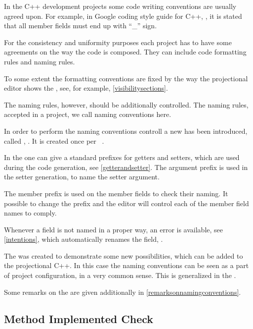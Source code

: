 In the C++ development projects some code writing conventions are usually agreed upon. For example, 
in Google coding style guide for C++, \cite{googlecppstyle}, it is stated that all member fields must end up with ``\_'' sign.

For the consistency and uniformity purposes each project has to have some agreements on the way the code is composed.
They can include code formatting rules and naming rules. 

To some extent the formatting conventions are fixed by the way the projectional editor shows the 
, see, for example, \ref{visibilitysections}.

The naming rules, however, should be additionally controlled. The naming rules, accepted in a project, we call 
naming conventions here.

In order to perform the naming conventions controll a new  has been introduced, called , 
. It is created once per \jbmps\ .


In the  one can give a standard prefixes for getters and setters, which are used during the code 
generation, see \ref{getterandsetter}. The argument prefix is used in the setter generation, to name the
setter argument.

The member prefix is used on the member fields to check their naming. It possible to change the prefix and the editor will control
each of the member field names to comply.

Whenever a field is not named in a proper way, an error  is available, see \ref{intentions}, 
which automatically renames the field, .


The   was created to demonstrate some new possibilities, which can be added to the projectional C++.
In this case the naming conventions can be seen as a part of project configuration, in a very common sense. This is generalized in the
.

Some remarks on the   are given additionally in \ref{remarksonnamingconventions}.


\subsection{Method Implemented Check}
\label{implementedcheck}

